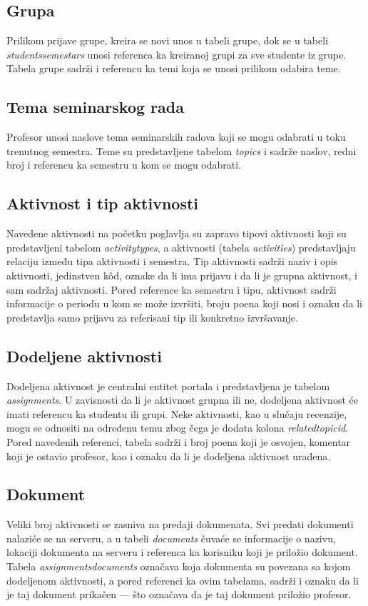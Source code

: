 \documentclass[12pt,oneside]{memoir}
\begin{document}
\subsection{Grupa}
Prilikom prijave grupe, kreira se novi unos u tabeli grupe, dok se u tabeli \emph{students{\textunderscore}semestars} unosi
referenca ka kreiranoj grupi za sve studente iz grupe. Tabela grupe sadrži i referencu ka temi koja se unosi prilikom odabira teme.

\subsection{Tema seminarskog rada} 
Profesor unosi naslove tema seminarskih radova koji se mogu odabrati u toku trenutnog semestra. Teme su predstavljene tabelom \emph{topics} i sadrže naslov, redni broj i referencu ka semestru u kom se mogu odabrati.

\subsection{Aktivnost i tip aktivnosti}
Navedene aktivnosti na početku poglavlja su zapravo tipovi aktivnosti koji su predstavljeni tabelom \emph{activity{\textunderscore}types},
a aktivnosti (tabela \emph{activities}) predstavljaju relaciju između tipa aktivnosti i semestra. 
Tip aktivnosti sadrži naziv i opis aktivnosti, jedinstven k\^{o}d, oznake da li ima prijavu i da li je grupna aktivnost, i sam sadržaj aktivnosti.
Pored reference ka semestru i tipu, aktivnost sadrži informacije o periodu u kom se može izvršiti, broju poena koji nosi i oznaku da li predstavlja
samo prijavu za referisani tip ili konkretno izvršavanje.

\subsection{Dodeljene aktivnosti}
Dodeljena aktivnost je centralni entitet portala i predstavljena je tabelom \emph{assignments}. U zavisnosti da li je aktivnost grupna ili ne, dodeljena aktivnost će imati referencu
ka studentu ili grupi. Neke aktivnosti, kao u slučaju recenzije, mogu se odnositi na određenu temu zbog čega je dodata kolona \emph{related{\textunderscore}topic{\textunderscore}id}. Pored
navedenih referenci, tabela sadrži i broj poena koji je osvojen, komentar koji je ostavio profesor, kao i oznaku da li je dodeljena aktivnost urađena. 

\subsection{Dokument}
Veliki broj aktivnosti se zasniva na predaji dokumenata. Svi predati dokumenti nalaziće se na serveru, a u tabeli \emph{documents} čuvaće se informacije o nazivu, lokaciji dokumenta
na serveru i referenca ka korisniku koji je priložio dokument. Tabela \emph{assignments{\textunderscore}documents} označava koja dokumenta su povezana sa kojom dodeljenom aktivnosti, a
pored referenci ka ovim tabelama, sadrži i oznaku da li je taj dokument prikačen --- što označava da je taj dokument priložio profesor.
\end{document}

